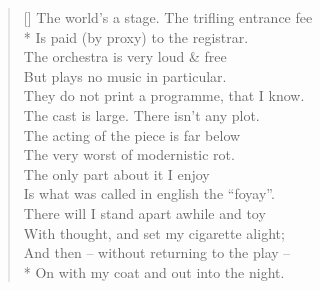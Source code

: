 \documentclass[MAIN]{subfiles}
\begin{document}
\settowidth{\versewidth}{The world's a stage. The trifling entrance fee}
\begin{verse}[\versewidth]
The world's a stage. The trifling entrance fee\\* 
\vin Is paid (by proxy) to the registrar.\\
The orchestra is very loud \& free\\
\vin But plays no music in particular.\\
They do not print a programme, that I know.\\
\vin The cast is large. There isn't any plot.\\
The acting of the piece is far below\\
\vin The very worst of modernistic rot.\\
The only part about it I enjoy\\
\vin Is what was called in english the ``foyay''.\\
There will I stand apart awhile and toy\\
\vin With thought, and set my cigarette alight;\\
And then -- without returning to the play --\\*
\vin On with my coat and out into the night.
\end{verse}
\end{document}
